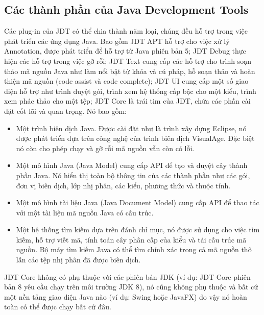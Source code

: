 \documentclass[12pt]{report}
\begin{document}
\subsection{Các thành phần của Java Development Tools}
Các plug-in của JDT có thể chia thành năm loại, chúng đều hỗ trợ trong việc phát triển các ứng dụng Java. Bao gồm JDT APT hỗ trợ cho việc xử lý Annotation, được phát triển để hỗ trợ từ Java phiên bản 5; JDT Debug thực hiện các hỗ trợ trong việc gỡ rỗi; JDT Text cung cấp các hỗ trợ cho trình soạn thảo mã nguồn Java như làm nổi bật từ khóa và cú pháp, hỗ soạn thảo và hoàn thiện mã nguồn (code assist và code complete); JDT UI cung cấp một số giao diện hỗ trợ như trình duyệt gói, trình xem hệ thống cấp bậc cho một kiểu, trình xem phác thảo cho một tệp; JDT Core là trái tim của JDT, chứa các phần cài đặt cốt lõi và quan trọng. Nó bao gồm:
\begin{itemize}
	\item Một trình biên dịch Java. Được cài đặt như là trình xây dựng Eclipse, nó được phát triển dựa trên công nghệ của trình biên dịch VisualAge. Đặc biệt nó còn cho phép chạy và gỡ rỗi mã nguồn vẫn còn có lỗi.
	\item Một mô hình Java (Java Model) cung cấp API để tạo và duyệt cây thành phần Java. Nó hiển thị toàn bộ thông tin của các thành phần như các gói, đơn vị biên dịch, lớp nhị phân, các kiểu, phương thức và thuộc tính.
	\item Một mô hình tài liệu Java (Java Document Model) cung cấp API để thao tác với một tài liệu mã nguồn Java có cấu trúc.
	\item Một hệ thống tìm kiếm dựa trên đánh chỉ mục, nó được sử dụng cho việc tìm kiếm, hỗ trợ viết mã, tính toán cây phân cấp của kiểu và tái cấu trúc mã nguồn. Bộ máy tìm kiếm Java có thể tìm chính xác trong cả mã nguồn thô lẫn các tệp nhị phân đã được biên dịch.
\end{itemize}

JDT Core không có phụ thuộc với các phiên bản JDK (ví dụ: JDT Core phiên bản 8 yêu cầu chạy trên môi trường JDK 8), nó cũng không phụ thuộc và bất cứ một nền tảng giao diện Java nào (ví dụ: Swing hoặc JavaFX) do vậy nó hoàn toàn có thể được chạy bất cứ đâu.
\end{document}
